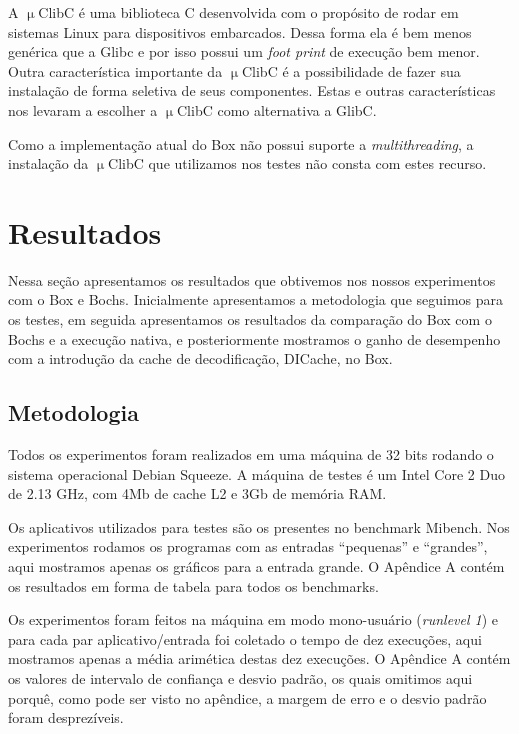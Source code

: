 \documentclass[11pt,twoside]{article}
\begin{document}
A $\upmu$ClibC é uma biblioteca C desenvolvida com o propósito de rodar em
sistemas Linux para dispositivos embarcados. Dessa forma ela é bem menos
genérica que a Glibc e por isso possui um \emph{foot print} de execução bem
menor. Outra característica importante da $\upmu$ClibC é a possibilidade de
fazer sua instalação de forma seletiva de seus componentes. Estas e outras
características nos levaram a escolher a $\upmu$ClibC como alternativa a GlibC.

Como a implementação atual do Box não possui suporte a \emph{multithreading}, a
instalação da $\upmu$ClibC que utilizamos nos testes não consta com estes
recurso.


\section{Resultados} \label{sec:resultados}

Nessa seção apresentamos os resultados que obtivemos nos nossos experimentos
com o Box e Bochs. Inicialmente apresentamos a metodologia que seguimos para
os testes, em seguida apresentamos os resultados da comparação do Box com o
Bochs e a execução nativa, e posteriormente mostramos o ganho de desempenho com
a introdução da cache de decodificação, DICache, no Box. 

\subsection{Metodologia}

Todos os experimentos foram realizados em uma máquina de 32 bits rodando o
sistema operacional Debian Squeeze. A máquina de testes é um Intel Core 2 Duo
de 2.13 GHz, com 4Mb de cache L2 e 3Gb de memória RAM.

Os aplicativos utilizados para testes são os presentes no benchmark Mibench. Nos
experimentos rodamos os programas com as entradas ``pequenas'' e ``grandes'',
aqui mostramos apenas os gráficos para a entrada grande. O Apêndice A contém
os resultados em forma de tabela para todos os benchmarks.

Os experimentos foram feitos na máquina em modo mono-usuário (\textit{runlevel
  1}) e para cada par aplicativo/entrada foi coletado o tempo de dez execuções,
aqui mostramos apenas a média arimética destas dez execuções. O Apêndice A
contém os valores de intervalo de confiança e desvio padrão, os quais omitimos
aqui porquê, como pode ser visto no apêndice, a margem de erro e o desvio padrão
foram desprezíveis.
\end{document}
